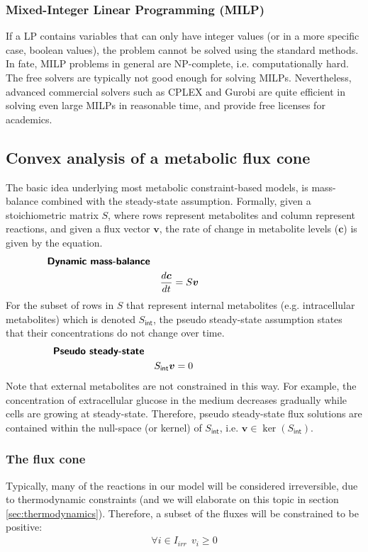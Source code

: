 \documentclass[10pt,a4paper]{article}
\newcommand{\mymatrix}[1]{#1}
\newcommand{\myvector}[1]{{\boldsymbol{#1}}}
\newcommand{\stoichmat}{\mymatrix{S}}
\newcommand{\stoichmatint}{\mymatrix{S}_{\mathsf{int}}}
\begin{document}
\subsubsection{Mixed-Integer Linear Programming (MILP)}
If a LP contains variables that can only have integer values (or in a more specific case, boolean values), the problem cannot be solved using the standard methods. In fate, MILP problems in general are NP-complete, i.e. computationally hard. The free solvers are typically not good enough for solving MILPs. Nevertheless, advanced commercial solvers such as CPLEX and Gurobi are quite efficient in solving even large MILPs in reasonable time, and provide free licenses for academics.

\subsection{Convex analysis of a metabolic flux cone}
The basic idea underlying most metabolic constraint-based models, is mass-balance combined with the steady-state assumption. Formally, given a stoichiometric matrix $\mymatrix{S}$, where rows represent metabolites and column represent reactions, and given a flux vector $\myvector{v}$, the rate of change in metabolite levels ($\myvector{c}$) is given by the equation.
\begin{eqnarray}\label{eq:dynamic-mass-balance}
	&\textsf{\textbf{Dynamic mass-balance}} &\nonumber\\
    &&\frac{d\myvector{c}}{dt} = \stoichmat \myvector{v}~~~~~~~~~~~~~~~~~~~~~~~~~~~~~~~~~~~~~
\end{eqnarray}
For the subset of rows in $\stoichmat$ that represent internal metabolites (e.g. intracellular metabolites) which is denoted $\stoichmatint$, the pseudo steady-state assumption states that their concentrations do not change over time.
\begin{eqnarray}\label{eq:pseudo-steady-state}
	&\textsf{\textbf{Pseudo steady-state}} &\nonumber\\
	&&\stoichmatint \myvector{v} = 0~~~~~~~~~~~~~~~~~~~~~~~~~~~~~~~~~~~~~
\end{eqnarray}
Note that external metabolites are not constrained in this way. For example, the concentration of extracellular glucose in the medium decreases gradually while cells are growing at steady-state. Therefore, pseudo steady-state flux solutions are contained within the null-space (or kernel) of $\stoichmatint$, i.e. $\myvector{v} \in \ker(\stoichmatint)$.

\subsubsection{The flux cone}
Typically, many of the reactions in our model will be considered irreversible, due to thermodynamic constraints (and we will elaborate on this topic in section \ref{sec:thermodynamics}). Therefore, a subset of the fluxes will be constrained to be positive:
\begin{eqnarray}\label{eq:irreversible}
\forall i \in I_{irr} ~~ v_i \geq 0
\end{eqnarray}
\end{document}
